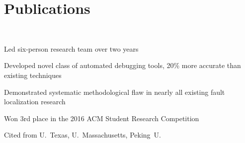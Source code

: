 \section{Publications}

 \\
\vspace{\topsep} %
\begin{tightemize}
\item Led six-person research team over two years
\item Developed novel class of automated debugging tools, 20\% more accurate than existing techniques
\item Demonstrated systematic methodological flaw in nearly all existing fault localization research
\item Won 3rd place in the 2016 ACM Student Research Competition
\item Cited from U.~Texas, U.~Massachusetts, Peking~U.
\end{tightemize}
\sectionsep
